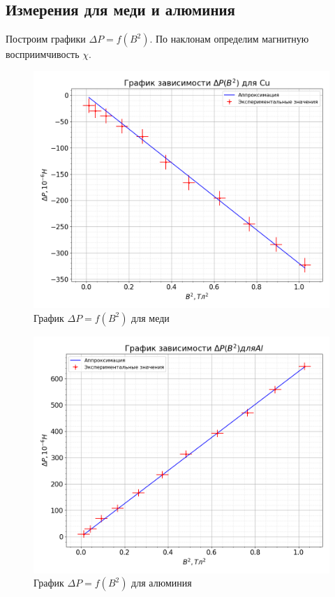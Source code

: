 \documentclass[a4paper, 12pt]{article}
\begin{document}
        \subsection{Измерения для меди и алюминия}

            Построим графики $\Delta P = f(B^2)$. По наклонам определим магнитную восприимчивость $\chi$.

            \begin{figure}[h]
                \centering
                \includegraphics[scale=0.5]{img/Cu.png}
                \caption{График $\Delta P = f(B^2)$ для меди} \label{img:Cu}
            \end{figure}

            \begin{figure}[h]
                \centering
                \includegraphics[scale=0.5]{img/Al.png}
                \caption{График $\Delta P = f(B^2)$ для алюминия} \label{img:Al}
            \end{figure}
\end{document}
